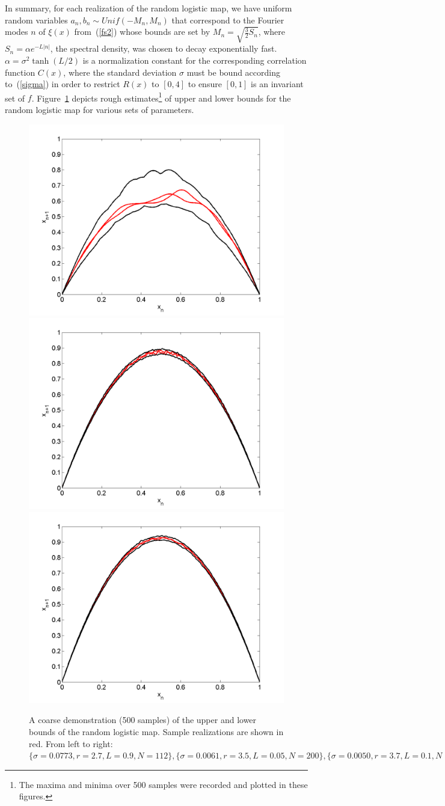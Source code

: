 In summary, for each realization of the random logistic map,
we have uniform random variables $a_n,b_n \sim Unif(-M_n,M_n)$ that correspond to the
Fourier modes $n$ of $\xi(x)$ from~(\ref{fs2}) whose bounds are set by
$M_n= \sqrt{\frac{3}{2}S_n}$, where $S_n=\alpha e^{-L|n|}$, the
spectral density, was chosen to decay exponentially fast. $\alpha = \sigma^2 \tanh(L/2)$ is a normalization constant for the corresponding
correlation function $C(x)$, where the standard deviation $\sigma$
must be bound according to~(\ref{sigma}) in order to restrict $R(x)$
to $[0,4]$ to ensure $[0,1]$ is an invariant set of
$f$. Figure~\ref{fig:envelope} depicts rough estimates\footnote{The
  maxima and minima over 500 samples were recorded and plotted in
  these figures.} of upper and lower bounds for the random logistic
map for various sets of parameters. 
\begin{figure}[htp]
\caption[Upper and lower bounds on the random logistic map]{A coarse
  demonstration (500 samples) of the upper and lower bounds of the random logistic
  map. Sample realizations are shown in red. From left to right:
  $\{\sigma=0.0773,r=2.7,L=0.9,N=112\}, \{\sigma=0.0061,r=3.5,L=0.05,N=200\},\{\sigma=0.0050,r=3.7,L=0.1,N=100\}$
  }\label{fig:envelope}
\centering
\includegraphics[width=.3\textwidth]{figs/envelope_500_r27_L09.png}\hfill
\includegraphics[width=.3\textwidth]{figs/envelope_500_r35_L005.png}\hfill
\includegraphics[width=.3\textwidth]{figs/envelope_500_r37_L01.png}
\end{figure}

